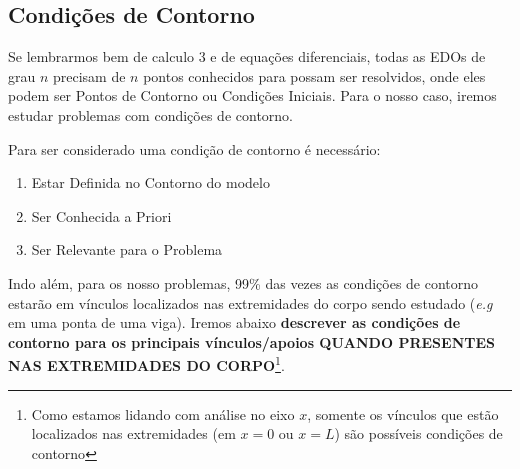 \documentclass{article}
\begin{document}
            \newpage
            \subsection{Condições de Contorno}
                Se lembrarmos bem de calculo 3 e de equações diferenciais, todas as EDOs de grau $n$ precisam de $n$ pontos conhecidos para possam ser resolvidos, onde eles podem ser Pontos de
                Contorno ou Condições Iniciais. Para o nosso caso, iremos estudar problemas com condições de contorno.

                Para ser considerado uma condição de contorno é necessário:
                \begin{enumerate}
                    \item Estar Definida no Contorno do modelo 
                    \item Ser Conhecida a Priori
                    \item Ser Relevante para o Problema
                \end{enumerate}

                Indo além, para os nosso problemas, 99\% das vezes as condições de contorno estarão em vínculos localizados nas extremidades do corpo sendo estudado (\emph{e.g} em uma ponta de uma viga). Iremos abaixo
                \textbf{descrever as condições de contorno para os principais vínculos/apoios QUANDO PRESENTES NAS EXTREMIDADES DO CORPO}\footnote{Como estamos lidando com análise no eixo $x$, somente
                os vínculos que estão localizados nas extremidades (em $x=0$ ou $x=L$) são possíveis condições de contorno}.
\end{document}
